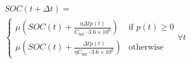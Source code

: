 \begin{equation}
\begin{split}
	&SOC(t+\Delta t) =\\
	&\begin{cases}
		\mu \left(SOC(t) + \frac{\eta \Delta t p(t)}{C_{bat}\cdot3.6\times10^6}\right) &\text{if } p(t) \geq 0\\
		\mu \left(SOC(t) + \frac{\Delta t p(t)}{\eta C_{bat}\cdot3.6\times10^6}\right) &\text{otherwise}
	\end{cases}
	\forall t
\end{split}
	\label{ch2:equ:battery-model-equation}
\end{equation}